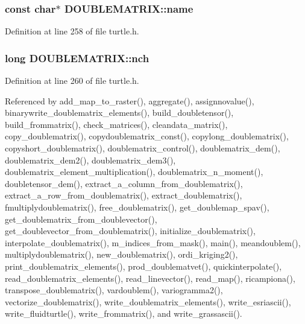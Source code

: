 \hypertarget{struct_d_o_u_b_l_e_m_a_t_r_i_x_a5ed15a13d3cf9c47b252b8a3e40035e9}{
\subsubsection[{name}]{\setlength{\rightskip}{0pt plus 5cm}const char$\ast$ D\-O\-U\-B\-L\-E\-M\-A\-T\-R\-I\-X\-::name}}\label{struct_d_o_u_b_l_e_m_a_t_r_i_x_a5ed15a13d3cf9c47b252b8a3e40035e9}


Definition at line 258 of file turtle.\-h.

\hypertarget{struct_d_o_u_b_l_e_m_a_t_r_i_x_acdddfd825d76dd0f7ee77803548b481c}{
\subsubsection[{nch}]{\setlength{\rightskip}{0pt plus 5cm}long D\-O\-U\-B\-L\-E\-M\-A\-T\-R\-I\-X\-::nch}}\label{struct_d_o_u_b_l_e_m_a_t_r_i_x_acdddfd825d76dd0f7ee77803548b481c}


Definition at line 260 of file turtle.\-h.



Referenced by add\-\_\-map\-\_\-to\-\_\-raster(), aggregate(), assignnovalue(), binarywrite\-\_\-doublematrix\-\_\-elements(), build\-\_\-doubletensor(), build\-\_\-frommatrix(), check\-\_\-matrices(), cleandata\-\_\-matrix(), copy\-\_\-doublematrix(), copydoublematrix\-\_\-const(), copylong\-\_\-doublematrix(), copyshort\-\_\-doublematrix(), doublematrix\-\_\-control(), doublematrix\-\_\-dem(), doublematrix\-\_\-dem2(), doublematrix\-\_\-dem3(), doublematrix\-\_\-element\-\_\-multiplication(), doublematrix\-\_\-n\-\_\-moment(), doubletensor\-\_\-dem(), extract\-\_\-a\-\_\-column\-\_\-from\-\_\-doublematrix(), extract\-\_\-a\-\_\-row\-\_\-from\-\_\-doublematrix(), extract\-\_\-doublematrix(), fmultiplydoublematrix(), free\-\_\-doublematrix(), get\-\_\-doublemap\-\_\-spav(), get\-\_\-doublematrix\-\_\-from\-\_\-doublevector(), get\-\_\-doublevector\-\_\-from\-\_\-doublematrix(), initialize\-\_\-doublematrix(), interpolate\-\_\-doublematrix(), m\-\_\-indices\-\_\-from\-\_\-mask(), main(), meandoublem(), multiplydoublematrix(), new\-\_\-doublematrix(), ordi\-\_\-kriging2(), print\-\_\-doublematrix\-\_\-elements(), prod\-\_\-doublematvet(), quickinterpolate(), read\-\_\-doublematrix\-\_\-elements(), read\-\_\-linevector(), read\-\_\-map(), ricampiona(), transpose\-\_\-doublematrix(), vardoublem(), variogramma2(), vectorize\-\_\-doublematrix(), write\-\_\-doublematrix\-\_\-elements(), write\-\_\-esriascii(), write\-\_\-fluidturtle(), write\-\_\-frommatrix(), and write\-\_\-grassascii().

